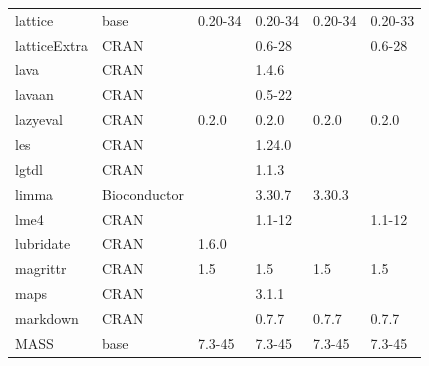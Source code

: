 \begin{longtable}{llllll}
\rowcolor{black!5}
lattice                       & base                      & 0.20-34     & 0.20-34     & 0.20-34        & 0.20-33            \\
\rowcolor{black!10}
latticeExtra                  & CRAN                      &             & 0.6-28      &                & 0.6-28            \\
\rowcolor{black!5}
lava                          & CRAN                      &             & 1.4.6       &                &                    \\
\rowcolor{black!10}
lavaan                        & CRAN                      &             & 0.5-22      &                &                   \\
\rowcolor{black!5}
lazyeval                      & CRAN                      & 0.2.0       & 0.2.0       & 0.2.0          & 0.2.0              \\
\rowcolor{black!10}
les                           & CRAN                      &             & 1.24.0      &                &                   \\
\rowcolor{black!5}
lgtdl                         & CRAN                      &             & 1.1.3       &                &                    \\
\rowcolor{black!10}
limma                         & Bioconductor              &             & 3.30.7      & 3.30.3         &                   \\
\rowcolor{black!5}
lme4                          & CRAN                      &             & 1.1-12      &                & 1.1-12             \\
\rowcolor{black!10}
lubridate                     & CRAN                      & 1.6.0       &             &                &                   \\
\rowcolor{black!5}
magrittr                      & CRAN                      & 1.5         & 1.5         & 1.5            & 1.5                \\
\rowcolor{black!10}
maps                          & CRAN                      &             & 3.1.1       &                &                   \\
\rowcolor{black!5}
markdown                      & CRAN                      &             & 0.7.7       & 0.7.7          & 0.7.7              \\
\rowcolor{black!10}
MASS                          & base                      & 7.3-45      & 7.3-45      & 7.3-45         & 7.3-45            \\

\end{longtable}
